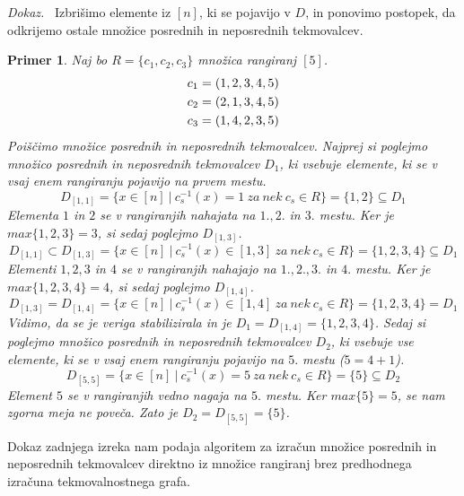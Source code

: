 \documentclass[a4paper, 12pt]{book}
\newtheorem{primer}{Primer}[chapter]
\newenvironment{dokaz}{\emph{Dokaz.}\ }{\hspace{\fill}{$\Box$}}
\begin{document}
\begin{dokaz}
    Izbrišimo elemente iz $[n]$, ki se pojavijo v $D$, in ponovimo postopek, da odkrijemo ostale množice posrednih in neposrednih tekmovalcev.
\end{dokaz}

\begin{primer}
     Naj bo $R = \{ c_1, c_2, c_3\}$ množica rangiranj $[5]$.
    \begin{align}
        c_1 &= (1, 2, 3, 4, 5) \notag\\
        c_2 &= (2, 1, 3, 4, 5) \notag\\
        c_3 &= (1, 4, 2, 3, 5) \notag
    \end{align}
    Poiščimo množice posrednih in neposrednih tekmovalcev. Najprej si poglejmo množico posrednih in neposrednih tekmovalcev $D_1$, ki vsebuje elemente, ki se v vsaj enem rangiranju pojavijo na prvem mestu.
    \[
        D_{[1,1]} = \{ x \in [n] \ | \ c_s^{-1}(x) = 1 \ za \ nek \ c_s \in R \} = \{ 1, 2 \} \subseteq D_1
    \]
    Elementa $1$ in $2$ se v rangiranjih nahajata na $1., 2.$ in $3.$ mestu. Ker je $max\{ 1, 2, 3\} = 3$, si sedaj poglejmo $D_{[1, 3]}$.
    \[
        D_{[1,1]} \subset D_{[1,3]} = \{ x \in [n] \ | \ c_s^{-1}(x) \in [1, 3] \ za \ nek \ c_s \in R \} = \{ 1, 2, 3, 4\} \subseteq D_1
    \]
    Elementi $1, 2, 3$ in $4$ se v rangiranjih nahajajo na $1., 2., 3.$ in $4.$ mestu. Ker je $max\{ 1, 2, 3, 4\} = 4$, si sedaj poglejmo $D_{[1, 4]}$.
    \[
        D_{[1,3]} = D_{[1,4]} = \{ x \in [n] \ | \ c_s^{-1}(x) \in [1, 4] \ za \ nek \ c_s \in R \} = \{ 1, 2, 3, 4\} = D_1
    \]
    Vidimo, da se je veriga stabilizirala in je $D_1 = D_{[1, 4]} = \{ 1, 2, 3, 4\}$. Sedaj si poglejmo množico posrednih in neposrednih tekmovalcev $D_2$, ki vsebuje vse elemente, ki se v vsaj enem rangiranju pojavijo na $5.$ mestu ($5 = 4 + 1$).
    \[
        D_{[5,5]} = \{ x \in [n] \ | \ c_s^{-1}(x) = 5 \ za \ nek \ c_s \in R \} = \{ 5 \} \subseteq D_2
    \]
    Element $5$ se v rangiranjih vedno nagaja na $5.$ mestu. Ker $max\{ 5 \} = 5$, se nam zgorna meja ne poveča. Zato je $D_2 = D_{[5, 5]} = \{ 5 \}$.
\end{primer}

Dokaz zadnjega izreka nam podaja algoritem za izračun množice posrednih in neposrednih tekmovalcev direktno iz množice rangiranj brez predhodnega izračuna tekmovalnostnega grafa.
\end{document}
